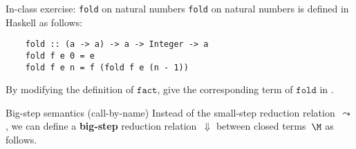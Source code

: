 \begin{frame}[fragile]{In-class exercise: \texttt{fold} on natural numbers}
  \texttt{fold} on natural numbers is defined in Haskell as follows:
  \begin{verbatim}
    fold :: (a -> a) -> a -> Integer -> a
    fold f e 0 = e
    fold f e n = f (fold f e (n - 1))
  \end{verbatim}
  By modifying the definition of $\mathtt{fact}$, give the corresponding
  term of $\mathtt{fold}$ in \PCF{}. 
\end{frame}


\begin{frame}{Big-step semantics (call-by-name)}
  Instead of the small-step reduction relation~$\leadsto$, we can define a
  \textbf{big-step} reduction relation~$\Downarrow$
  between closed terms~$\M$ as follows.


\end{frame}
